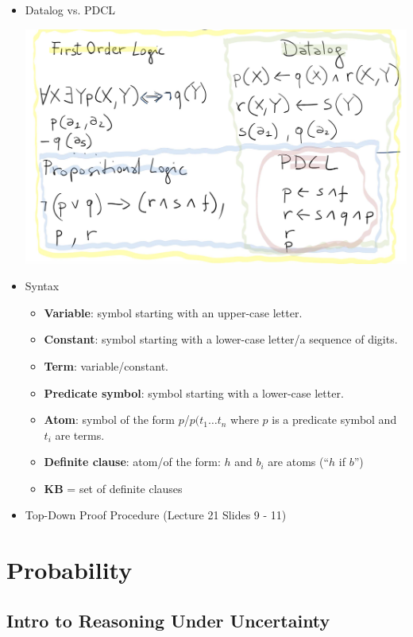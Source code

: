\documentclass{article}
\begin{document}
\begin{itemize}
    \item Datalog vs. PDCL

    \includegraphics[scale=0.3]{datalog_vs_pdcl}
    \item Syntax
        \begin{itemize}
            \item \textbf{Variable}: symbol starting with an upper-case letter.
            \item \textbf{Constant}: symbol starting with a lower-case letter/a sequence of digits.
            \item \textbf{Term}: variable/constant.
            \item \textbf{Predicate symbol}: symbol starting with a lower-case letter.
            \item \textbf{Atom}: symbol of the form $p$/$p(t_1 \ldots t_n$ where $p$ is a predicate symbol and $t_i$ are terms.
            \item \textbf{Definite clause}: atom/of the form: $h$ and $b_i$ are atoms (``$h$ if $b$'')
            \item \textbf{KB} = set of definite clauses
        \end{itemize}
    \item Top-Down Proof Procedure (Lecture 21 Slides 9 - 11)
\end{itemize}

\section{Probability}

\subsection{Intro to Reasoning Under Uncertainty}
\end{document}
